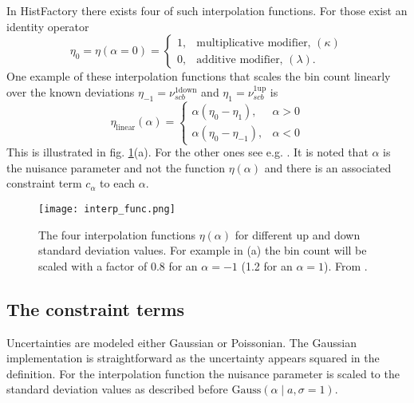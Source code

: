 In HistFactory there exists four of such interpolation functions. For those exist an identity operator 
\begin{equation}
    \eta_0=\eta (\alpha=0) =
    \begin{cases}
        1 ,& \text{multiplicative modifier, } (\kappa) \\
        0 ,& \text{additive modifier, } (\lambda).
    \end{cases}
\end{equation}
One example of these interpolation functions that scales the bin count linearly over the known deviations $\eta_{-1}=\nu_{scb}^\mathrm{1down}$ and $\eta_{1}=\nu_{scb}^\mathrm{1up}$ is
\begin{equation}
    \eta_\mathrm{linear}(\alpha)=
    \begin{cases}
        \alpha(\eta_0 - \eta_1) ,& \alpha>0\\
        \alpha(\eta_0 - \eta_{-1}) ,& \alpha<0
    \end{cases}
\end{equation}
This is illustrated in fig. \ref{fig:interp_func}(a). For the other ones see e.g. \citep{heinrich2019searches}. It is noted that $\alpha$ is the nuisance parameter and not the function $\eta(\alpha)$ and there is an associated constraint term $c_\alpha$ to each $\alpha$.
\begin{figure}
    \centering
    \texttt{[image: interp\_func.png]}
        \caption[]{The four interpolation functions $\eta(\alpha)$ for different up and down standard deviation values. For example in (a) the bin count will be scaled with a factor of 0.8 for an $\alpha=-1$ (1.2 for an $\alpha=1$). From \citep{cranmer2012histfactory}.}
    \label{fig:interp_func}    
\end{figure}

\subsection{The constraint terms}\label{sec:constraint_terms}
Uncertainties are modeled either Gaussian or Poissonian. The Gaussian implementation is straightforward as the uncertainty appears squared in the definition. For the interpolation function the nuisance parameter is scaled to the standard deviation values as described before $\mathrm{Gauss}(\alpha \mid a, \sigma=1)$. 

